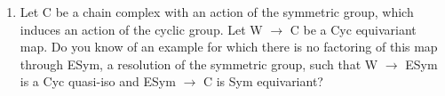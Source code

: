 \documentclass{report}
\begin{document}
	\begin{enumerate}
		\item Let C be a chain complex with an action of the symmetric group, which induces an action of the cyclic group.
		Let W $\to$ C be a Cyc equivariant map. Do you know of an example for which there is no factoring of this map through ESym, a resolution of the symmetric group, such that W $\to$ ESym is a Cyc quasi-iso and ESym $\to$ C is Sym equivariant?
	\end{enumerate}
\end{document}
